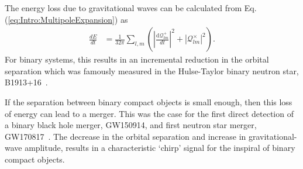 \documentclass[../Thesis.tex]{subfiles}
\begin{document}
    The energy loss due to gravitational waves can be calculated from Eq.(\ref{eq:Intro:MultipoleExpansion}) as~\cite{Nagar2005}
     \begin{align}
        \frac{dE}{dt} & = \frac{1}{32 \pi}\sum_{l,m} \left(\left|\frac{\mathrm{d} \mathcal{Q}^{+}_{lm}}{dt}\right|^2 + \left|\mathcal{Q}^\times_{lm}\right|^2\right). \label{eq:Intro:EnergyLoss}
    \end{align}
    For binary systems, this results in an incremental reduction in the orbital separation which was famously measured in the Hulse-Taylor binary neutron star, B1913+16~\cite{Hulse1975,Taylor1982,Weisberg2016}. \par 
    
    If the separation between binary compact objects is small enough, then this loss of energy can lead to a merger.
    This was the case for the first direct detection of a binary black hole merger, GW150914, and first neutron star merger, GW170817~\cite{GW150914Detection,GW170817Detection}. 
    The decrease in the orbital separation and increase in gravitational-wave amplitude, results in a characteristic `chirp' signal for the inspiral of binary compact objects.
    
\end{document}
